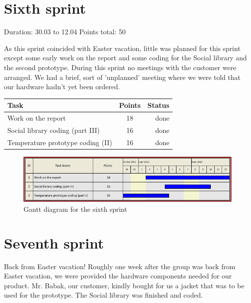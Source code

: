 \newpage

\section{Sixth sprint}

Duration: 30.03 to 12.04
Points total: 50

As this sprint coincided with Easter vacation, little
was planned for this sprint except some early work on the report
and some coding for the Social library and the second prototype.
During this sprint no meetings with the customer were arranged.
We had a brief, sort of 'unplanned' meeting where we were told
that our hardware hadn't yet been ordered.

\begin{table}[ht!]
\begin{tabular}{ | l | c | r | }

\hline
\textbf{Task} & \textbf{Points} & \textbf{Status} \\
\hline

Work on the report			& 18 & done \\
\hline
Social library coding (part III)	& 16 & done \\
\hline
Temperature prototype coding (II)	& 16 & done \\
\hline

\end{tabular}
\end{table}

\begin{figure}[h!]
\centering \includegraphics[scale=0.8]{img/sprints-gantt6.png}
\caption{Gantt diagram for the sixth sprint}
\label{fig:sprints-gantt6}
\end{figure}

\section{Seventh sprint}

Back from Easter vacation! Roughly one week after the group
was back from Easter vacation, we were provided the hardware components
needed for our product. Mr. Babak, our customer, kindly bought for us
a jacket that was to be used for the prototype.
The Social library was finished and coded.

